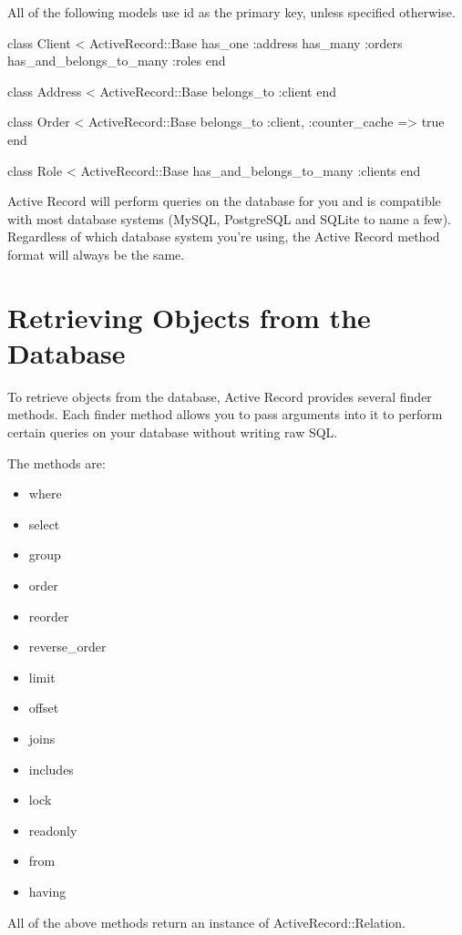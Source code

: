 \documentclass[10pt]{book}
\newenvironment{code}{%
  \scriptsize
    \verbatim
}{%
    \endverbatim
    \newline
}
\begin{document}
All of the following models use id as the primary key, unless specified otherwise.
\begin{code}
class Client < ActiveRecord::Base
  has_one :address
  has_many :orders
  has_and_belongs_to_many :roles
end
\end{code}
\begin{code}
class Address < ActiveRecord::Base
  belongs_to :client
end
\end{code}
\begin{code}
class Order < ActiveRecord::Base
  belongs_to :client, :counter_cache => true
end
\end{code}
\begin{code}
class Role < ActiveRecord::Base
  has_and_belongs_to_many :clients
end
\end{code}


Active Record will perform queries on the database for you and is  compatible with most database systems (MySQL, PostgreSQL and SQLite to  name a few). Regardless of which database system you’re using, the  Active Record method format will always be the same.

\section{ Retrieving Objects from the Database}

To retrieve objects from the database, Active Record provides several  finder methods. Each finder method allows you to pass arguments into it  to perform certain queries on your database without writing raw SQL.

The methods are:
\begin{itemize}
	\item where
	\item select
	\item group
	\item order
	\item reorder
	\item reverse\_order
	\item limit
	\item offset
	\item joins
	\item includes
	\item lock
	\item readonly
	\item from
	\item having
\end{itemize}

All of the above methods return an instance of ActiveRecord::Relation.
\end{document}
